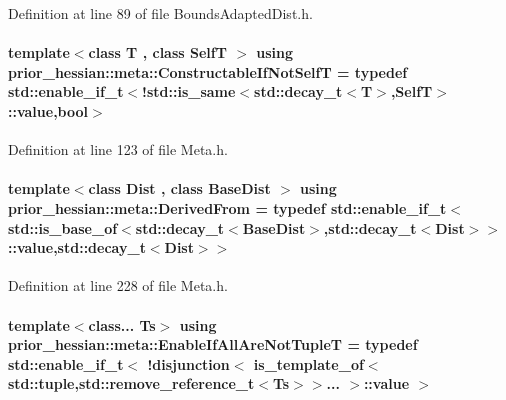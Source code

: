 Definition at line 89 of file Bounds\+Adapted\+Dist.\+h.

\paragraph[{\texorpdfstring{Constructable\+If\+Not\+SelfT}{ConstructableIfNotSelfT}}]{\setlength{\rightskip}{0pt plus 5cm}template$<$class T , class SelfT $>$ using {\bf prior\+\_\+hessian\+::meta\+::\+Constructable\+If\+Not\+SelfT} = typedef std\+::enable\+\_\+if\+\_\+t$<$!std\+::is\+\_\+same$<$std\+::decay\+\_\+t$<$T$>$,SelfT$>$\+::value,bool$>$}\hypertarget{namespaceprior__hessian_1_1meta_a1aa5afbb3de8629472e4cd3fbabf13ae}{}\label{namespaceprior__hessian_1_1meta_a1aa5afbb3de8629472e4cd3fbabf13ae}


Definition at line 123 of file Meta.\+h.

\paragraph[{\texorpdfstring{Derived\+From}{DerivedFrom}}]{\setlength{\rightskip}{0pt plus 5cm}template$<$class Dist , class Base\+Dist $>$ using {\bf prior\+\_\+hessian\+::meta\+::\+Derived\+From} = typedef std\+::enable\+\_\+if\+\_\+t$<$std\+::is\+\_\+base\+\_\+of$<$std\+::decay\+\_\+t$<${\bf Base\+Dist}$>$,std\+::decay\+\_\+t$<$Dist$>$$>$\+::value,std\+::decay\+\_\+t$<$Dist$>$$>$}\hypertarget{namespaceprior__hessian_1_1meta_a7dcd55f8c696cfac1fe7872289c4d3e1}{}\label{namespaceprior__hessian_1_1meta_a7dcd55f8c696cfac1fe7872289c4d3e1}


Definition at line 228 of file Meta.\+h.

\paragraph[{\texorpdfstring{Enable\+If\+All\+Are\+Not\+TupleT}{EnableIfAllAreNotTupleT}}]{\setlength{\rightskip}{0pt plus 5cm}template$<$class... Ts$>$ using {\bf prior\+\_\+hessian\+::meta\+::\+Enable\+If\+All\+Are\+Not\+TupleT} = typedef std\+::enable\+\_\+if\+\_\+t$<$ !{\bf disjunction}$<$ {\bf is\+\_\+template\+\_\+of}$<$std\+::tuple,std\+::remove\+\_\+reference\+\_\+t$<$Ts$>$$>$... $>$\+::value $>$}\hypertarget{namespaceprior__hessian_1_1meta_a4c0f2ff12f5d30e05ef9ca55a3f35318}{}\label{namespaceprior__hessian_1_1meta_a4c0f2ff12f5d30e05ef9ca55a3f35318}


